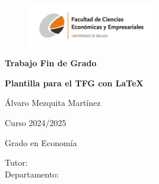 \documentclass[13pt,a4paper]{report}
\begin{document}
\begin{titlepage}
    \centering 
    \begin{figure}[h!]
        \centering
        \includegraphics[width=0.5\textwidth]{logo.png}
    \end{figure}
    
    \vspace*{1cm} 
    \Huge
    \textbf{Trabajo Fin de Grado}
    \vspace*{1cm}
    
    \Huge
    
    \textbf{Plantilla para el TFG con \LaTeX}
    
    \vspace{0.5cm}
    \LARGE 
    
    Álvaro Mezquita Martínez
    
    \vspace{0.5cm} 

    Curso 2024/2025
        
    \vspace{0.5cm}

    Grado en Economía
    
    \vfill

    \raggedleft     
    Tutor:  \makebox[5cm]{\dotfill} %
    \\
    Departamento:  \makebox[5cm]{\dotfill} %
    
    \vspace{5cm}
\end{titlepage}


\newpage

\fancyhf{} %
\thispagestyle{fancy} %
\end{document}
